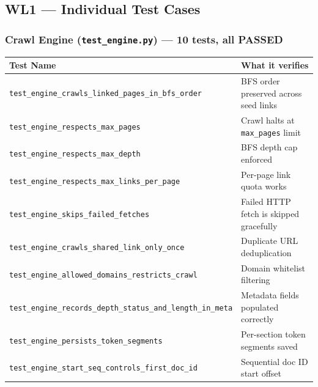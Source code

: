 \documentclass[12pt]{article}
\begin{document}
\subsection*{WL1 --- Individual Test Cases}

\subsubsection*{Crawl Engine (\texttt{test\_engine.py}) --- 10 tests, all PASSED}
\begin{table}[H]
\centering
\footnotesize
\begin{tabular}{|p{7cm}|p{7.5cm}|}
\hline
\textbf{Test Name} & \textbf{What it verifies} \\
\hline
\texttt{test\_engine\_crawls\_linked\_pages\_in\_bfs\_order}      & BFS order preserved across seed links \\
\texttt{test\_engine\_respects\_max\_pages}                       & Crawl halts at \texttt{max\_pages} limit \\
\texttt{test\_engine\_respects\_max\_depth}                       & BFS depth cap enforced \\
\texttt{test\_engine\_respects\_max\_links\_per\_page}            & Per-page link quota works \\
\texttt{test\_engine\_skips\_failed\_fetches}                     & Failed HTTP fetch is skipped gracefully \\
\texttt{test\_engine\_crawls\_shared\_link\_only\_once}           & Duplicate URL deduplication \\
\texttt{test\_engine\_allowed\_domains\_restricts\_crawl}         & Domain whitelist filtering \\
\texttt{test\_engine\_records\_depth\_status\_and\_length\_in\_meta} & Metadata fields populated correctly \\
\texttt{test\_engine\_persists\_token\_segments}                  & Per-section token segments saved \\
\texttt{test\_engine\_start\_seq\_controls\_first\_doc\_id}       & Sequential doc ID start offset \\
\hline
\end{tabular}
\end{table}
\end{document}
